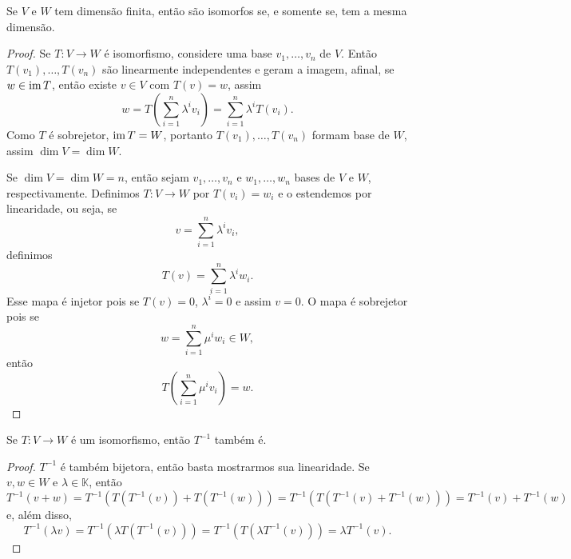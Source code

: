 \begin{corollary}
    Se $V$ e $W$ tem dimensão finita, então são isomorfos se, e somente se, tem a mesma dimensão.
\end{corollary}
\begin{proof}
    Se $T \colon V \to W$ é isomorfismo, considere uma base $v_1, \dots, v_n$ de $V$. Então $T(v_1), \dots, T(v_n)$ são linearmente independentes e geram a imagem, afinal, se $w \in \operatorname{im} T$, então existe $v \in V$ com $T(v) = w$, assim \begin{equation}
        w = T\left(\sum_{i = 1}^n \lambda^i v_i\right) = \sum_{i = 1}^n \lambda^i T(v_i).
    \end{equation} Como $T$ é sobrejetor, $\operatorname{im} T = W$, portanto $T(v_1), \dots, T(v_n)$ formam base de $W$, assim $\dim V = \dim W$.

    Se $\dim V = \dim W = n$, então sejam $v_1, \dots, v_n$ e $w_1, \dots, w_n$ bases de $V$ e $W$, respectivamente. Definimos $T \colon V \to W$ por $T(v_i) = w_i$ e o estendemos por linearidade, ou seja, se \begin{equation}
        v = \sum_{i = 1}^n \lambda^i v_i,
    \end{equation} definimos \begin{equation}
        T(v) = \sum_{i = 1}^n \lambda^i w_i.
    \end{equation} Esse mapa é injetor pois se $T(v) = 0$, $\lambda^i = 0$ e assim $v = 0$. O mapa é sobrejetor pois se \begin{equation}
        w = \sum_{i = 1}^n \mu^i w_i \in W,
    \end{equation} então \begin{equation}
        T\left(\sum_{i = 1}^n \mu^i v_i\right) = w.
    \end{equation}
\end{proof}

\begin{proposition}
    Se $T \colon V \to W$ é um isomorfismo, então $T^{-1}$ também é.
\end{proposition}
\begin{proof}
    $T^{-1}$ é também bijetora, então basta mostrarmos sua linearidade. Se $v, w \in W$ e $\lambda \in \mathbb{K}$, então \begin{equation}
        T^{-1}(v + w) = T^{-1}(T(T^{-1}(v)) + T(T^{-1}(w))) = T^{-1}(T(T^{-1}(v) + T^{-1}(w))) = T^{-1}(v) + T^{-1}(w)
    \end{equation} e, além disso, \begin{equation}
        T^{-1}(\lambda v) = T^{-1}(\lambda T(T^{-1}(v))) = T^{-1}(T(\lambda T^{-1}(v))) = \lambda T^{-1}(v).
    \end{equation}
\end{proof}

